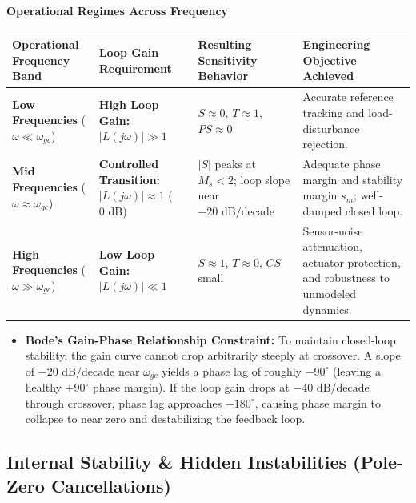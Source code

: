 \documentclass[12pt,onecolumn,twoside ]{article}
\begin{document}
	\paragraph{Operational Regimes Across Frequency}
	\begin{center}\small\begin{tabularx}{\textwidth}{*{4}{Y}}
			\toprule
			\textbf{Operational Frequency Band} & \textbf{Loop Gain Requirement} & \textbf{Resulting Sensitivity Behavior} & \textbf{Engineering Objective Achieved} \\
			\midrule
			\textbf{Low Frequencies} ($\omega \ll \omega_{gc}$) & \textbf{High Loop Gain:} $\lvert L(j\omega)\rvert \gg 1$ & $S \approx 0$, $T \approx 1$, $PS \approx 0$ & Accurate reference tracking and load-disturbance rejection. \\
			\textbf{Mid Frequencies} ($\omega \approx \omega_{gc}$) & \textbf{Controlled Transition:} $\lvert L(j\omega)\rvert \approx 1$ ($0\text{ dB}$) & $\lvert S\rvert$ peaks at $M_s < 2$; loop slope near $-20\text{ dB/decade}$ & Adequate phase margin and stability margin $s_m$; well-damped closed loop. \\
			\textbf{High Frequencies} ($\omega \gg \omega_{gc}$) & \textbf{Low Loop Gain:} $\lvert L(j\omega)\rvert \ll 1$ & $S \approx 1$, $T \approx 0$, $CS$ small & Sensor-noise attenuation, actuator protection, and robustness to unmodeled dynamics. \\
			\bottomrule
	\end{tabularx}\end{center}
	\begin{itemize}
		\item
		\textbf{Bode's Gain-Phase Relationship Constraint:} To maintain closed-loop stability, the gain curve cannot drop arbitrarily steeply at crossover. A slope of $-20\text{ dB/decade}$ near $\omega_{gc}$ yields a phase lag of roughly $-90^\circ$ (leaving a healthy $+90^\circ$ phase margin). If the loop gain drops at $-40\text{ dB/decade}$ through crossover, phase lag approaches $-180^\circ$, causing phase margin to collapse to near zero and destabilizing the feedback loop.
	\end{itemize}
	
	\subsection{Internal Stability \& Hidden Instabilities (Pole-Zero Cancellations)}
\end{document}

